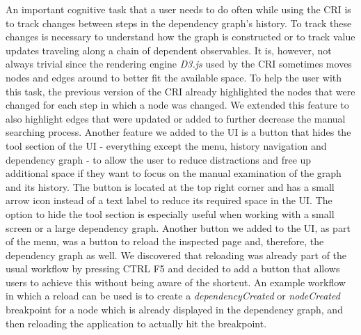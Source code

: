 An important cognitive task that a user needs to do often while using the CRI is to track changes between steps in the dependency graph's history. To track these changes is necessary to understand how the graph is constructed or to track value updates traveling along a chain of dependent observables. It is, however, not always trivial since the rendering engine \emph{D3.js} \cite{D3JS} used by the CRI sometimes moves nodes and edges around to better fit the available space. To help the user with this task, the previous version of the CRI already highlighted the nodes that were changed for each step in which a node was changed. We extended this feature to also highlight edges that were updated or added to further decrease the manual searching process. Another feature we added to the UI is a button that hides the tool section of the UI - everything except the menu, history navigation and dependency graph - to allow the user to reduce distractions and free up additional space if they want to focus on the manual examination of the graph and its history. The button is located at the top right corner and has a small arrow icon instead of a text label to reduce its required space in the UI. The option to hide the tool section is especially useful when working with a small screen or a large dependency graph. Another button we added to the UI, as part of the menu, was a button to reload the inspected page and, therefore, the dependency graph as well. We discovered that reloading was already part of the usual workflow by pressing CTRL F5 and decided to add a button that allows users to achieve this without being aware of the shortcut. An example workflow in which a reload can be used is to create a \emph{dependencyCreated} or \emph{nodeCreated} breakpoint for a node which is already displayed in the dependency graph, and then reloading the application to actually hit the breakpoint.
